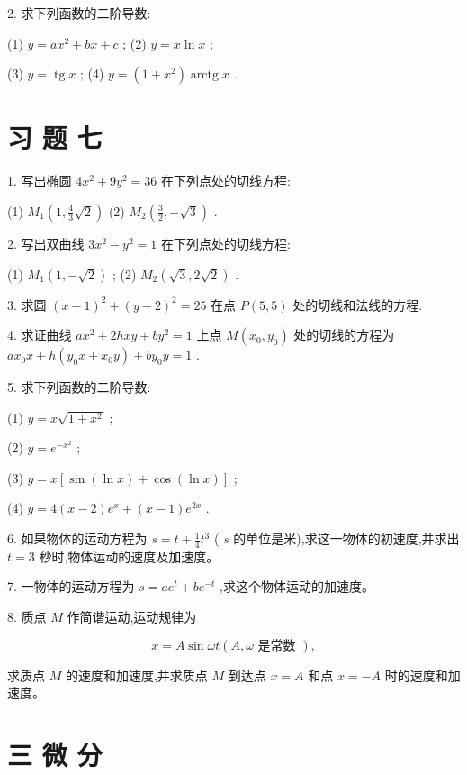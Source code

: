 \documentclass[10pt]{article}
\begin{document}
2. 求下列函数的二阶导数:

(1) \(y = a{x}^{2} + {bx} + c\) ; (2) \(y = x\ln x\) ;

(3) \(y = \operatorname{tg}x\) ; (4) \(y = \left( {1 + {x}^{2}}\right) \operatorname{arctg}x\) .

\section*{习 题 七}

1. 写出椭圆 \(4{x}^{2} + 9{y}^{2} = {36}\) 在下列点处的切线方程:

(1) \({M}_{1}\left( {1,\frac{4}{3}\sqrt{2}}\right)\) (2) \({M}_{2}\left( {\frac{3}{2}, - \sqrt{3}}\right)\) .

2. 写出双曲线 \(3{x}^{2} - {y}^{2} = 1\) 在下列点处的切线方程:

(1) \({M}_{1}\left( {1, - \sqrt{2}}\right)\) ; (2) \({M}_{2}\left( {\sqrt{3},2\sqrt{2}}\right)\) .

3. 求圆 \({\left( x - 1\right) }^{2} + {\left( y - 2\right) }^{2} = {25}\) 在点 \(P\left( {5,5}\right)\) 处的切线和法线的方程.

4. 求证曲线 \(a{x}^{2} + {2hxy} + b{y}^{2} = 1\) 上点 \(M\left( {{x}_{0},{y}_{0}}\right)\) 处的切线的方程为 \(a{x}_{0}x + h\left( {{y}_{0}x + {x}_{0}y}\right) + b{y}_{0}y = 1\) .

5. 求下列函数的二阶导数:

(1) \(y = x\sqrt{1 + {x}^{2}}\) ;

(2) \(y = {e}^{-{x}^{2}}\) ;

(3) \(y = x\left\lbrack {\sin \left( {\ln x}\right) + \cos \left( {\ln x}\right) }\right\rbrack\) ;

(4) \(y = 4\left( {x - 2}\right) {e}^{x} + \left( {x - 1}\right) {e}^{2x}\) .

6. 如果物体的运动方程为 \(s = t + \frac{1}{4}{t}^{3}\) ( \(s\) 的单位是米),求这一物体的初速度,并求出 \(t = 3\) 秒时,物体运动的速度及加速度。

7. 一物体的运动方程为 \(s = a{e}^{t} + b{e}^{-t}\) ,求这个物体运动的加速度。

8. 质点 \(M\) 作简谐运动,运动规律为

\[
x = A\sin {\omega t}\left( {A,\omega \text{ 是常数 }}\right) ,
\]

求质点 \(M\) 的速度和加速度,并求质点 \(M\) 到达点 \(x = A\) 和点 \(x = - A\) 时的速度和加速度。

\section*{三 微 分}
\end{document}
